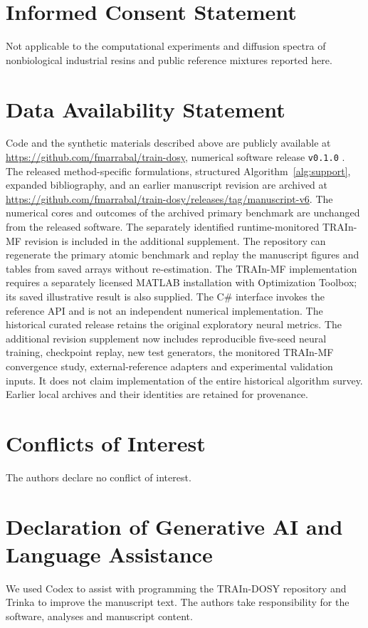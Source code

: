 \section*{Informed Consent Statement}
Not applicable to the computational experiments and diffusion spectra of nonbiological industrial resins and public reference mixtures reported here.

\section*{Data Availability Statement}
Code and the synthetic materials described above are publicly available at \url{https://github.com/fmarrabal/train-dosy}, numerical software release \texttt{v0.1.0} \cite{software}. The released method-specific formulations, structured Algorithm~\ref{alg:support}, expanded bibliography, and an earlier manuscript revision are archived at \url{https://github.com/fmarrabal/train-dosy/releases/tag/manuscript-v6}. The numerical cores and outcomes of the archived primary benchmark are unchanged from the released software. The separately identified runtime-monitored TRAIn-MF revision is included in the additional supplement. The repository can regenerate the primary atomic benchmark and replay the manuscript figures and tables from saved arrays without re-estimation. The TRAIn-MF implementation requires a separately licensed MATLAB installation with Optimization Toolbox; its saved illustrative result is also supplied. The C\# interface invokes the reference API and is not an independent numerical implementation. The historical curated release retains the original exploratory neural metrics. The additional revision supplement now includes reproducible five-seed neural training, checkpoint replay, new test generators, the monitored TRAIn-MF convergence study, external-reference adapters and experimental validation inputs. It does not claim implementation of the entire historical algorithm survey. Earlier local archives and their identities are retained for provenance.

\section*{Conflicts of Interest}
The authors declare no conflict of interest.

\section*{Declaration of Generative AI and Language Assistance}
We used Codex to assist with programming the TRAIn-DOSY repository and Trinka
to improve the manuscript text. The authors take responsibility for the software,
analyses and manuscript content.
